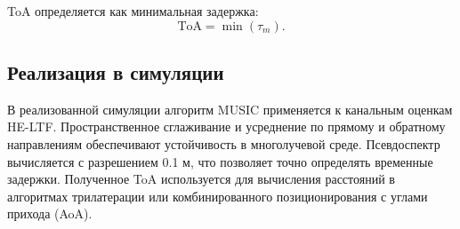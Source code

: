 \documentclass{article}
\begin{document}
ToA определяется как минимальная задержка:
\begin{equation}
\text{ToA} = \min(\tau_m).
\end{equation}

\subsection{Реализация в симуляции}

В реализованной симуляции алгоритм MUSIC применяется к канальным оценкам HE-LTF. Пространственное сглаживание и усреднение по прямому и обратному направлениям обеспечивают устойчивость в многолучевой среде. Псевдоспектр вычисляется с разрешением 0.1 м, что позволяет точно определять временные задержки. Полученное ToA используется для вычисления расстояний в алгоритмах трилатерации или комбинированного позиционирования с углами прихода (AoA).
\end{document}
